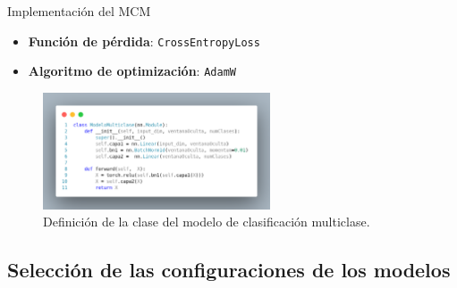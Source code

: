 \begin{frame}{Implementación del MCM}
	\begin{itemize}
		\item \textbf{Función de pérdida}: \texttt{CrossEntropyLoss}
		\item \textbf{Algoritmo de optimización}: \texttt{AdamW}
	\end{itemize}
	
	\begin{figure}[H]
	    \centering
	    \includegraphics[width=0.6\textwidth]{../Memoria/img/modelo/codigo/modeloMUL.png}
	    	\caption{Definición de la clase del modelo de clasificación multiclase.}
    		\label{fig:modBIN}
	\end{figure}
	
	\begin{table}[H]
		\centering 
		\caption{Valores de los hiperparámetros utilizados en los experimentos del modelo de clasificación multiclase.}
		\label{tab:hiperBIN}
	\end{table}
\end{frame}



\subsection{Selección de las configuraciones de los modelos}

